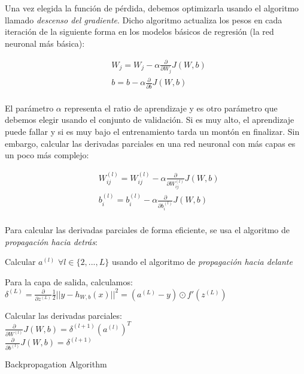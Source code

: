 Una vez elegida la función de pérdida, debemos optimizarla usando el algoritmo llamado \textit{descenso del gradiente}. Dicho algoritmo actualiza los pesos en cada iteración de la siguiente forma en los modelos básicos de regresión (la red neuronal más básica):

\begin{align*}
	&W_j = W_j - \alpha \frac{\partial}{\partial W_j} J(W,b)\\
	&b = b - \alpha \frac{\partial}{\partial b} J(W,b)\\
\end{align*}

El parámetro $\alpha$ representa el ratio de aprendizaje y es otro parámetro que debemos elegir usando el conjunto de validación. Si es muy alto, el aprendizaje puede fallar y si es muy bajo el entrenamiento tarda un montón en finalizar. Sin embargo, calcular las derivadas parciales en una red neuronal con más capas es un poco más complejo:

\begin{align*}
	&W^{(l)}_{ij} = W^{(l)}_{ij} - \alpha \frac{\partial}{\partial W^{(l)}_{ij}} J(W,b)\\
	&b^{(l)}_i = b^{(l)}_i - \alpha \frac{\partial}{\partial b^{(l)}_i} J(W,b)\\
\end{align*}

Para calcular las derivadas parciales de forma eficiente, se usa el algoritmo de \textit{propagación hacia detrás}:\\

\begin{algorithm}[H]
	\SetAlgoLined
	
	Calcular $a^{(l)}$ $\forall l \in \{2, ..., L\}$ usando el algoritmo de \textit{propagación hacia delante}
	
	Para la capa de salida, calculamos: $\delta^{(L)} = \frac{\partial}{\partial z^{(L)}} \frac{1}{2} || y - h_{W,b}(x) ||^2 = (a^{(L)}- y) \odot f'(z^{(L)})$
	
	
	Calcular las derivadas parciales:\\
	\nonl $\frac{\partial}{\partial W^{(l)}} J(W,b) = \delta^{(l+1)}(a^{(l)})^T$\\
	\nonl $\frac{\partial}{\partial b^{(l)}} J(W,b) = \delta^{(l+1)}$
	
	\caption{Backpropagation Algorithm}
\end{algorithm}

